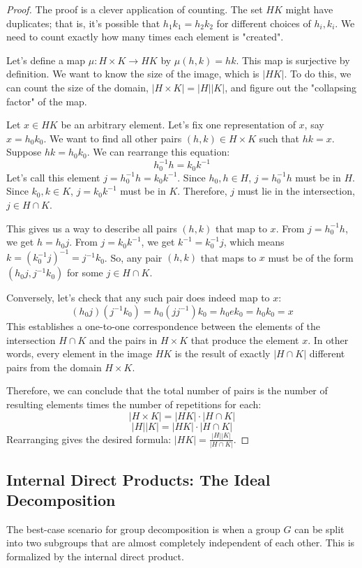 \documentclass[12pt,a4paper]{article}
\theoremstyle{plain} %
\theoremstyle{definition} %
\theoremstyle{remark} %
\begin{document}
\begin{proof}
The proof is a clever application of counting. The set $HK$ might have duplicates; that is, it's possible that $h_1k_1 = h_2k_2$ for different choices of $h_i, k_i$. We need to count exactly how many times each element is "created".

Let's define a map $\mu: H \times K \to HK$ by $\mu(h,k) = hk$. This map is surjective by definition. We want to know the size of the image, which is $|HK|$. To do this, we can count the size of the domain, $|H \times K| = |H||K|$, and figure out the "collapsing factor" of the map.

Let $x \in HK$ be an arbitrary element. Let's fix one representation of $x$, say $x=h_0k_0$. We want to find all other pairs $(h,k) \in H \times K$ such that $hk = x$.
Suppose $hk = h_0k_0$. We can rearrange this equation:
\[
h_0^{-1}h = k_0k^{-1}
\]
Let's call this element $j = h_0^{-1}h = k_0k^{-1}$.
Since $h_0, h \in H$, $j = h_0^{-1}h$ must be in $H$.
Since $k_0, k \in K$, $j = k_0k^{-1}$ must be in $K$.
Therefore, $j$ must lie in the intersection, $j \in H \cap K$.

This gives us a way to describe all pairs $(h,k)$ that map to $x$.
From $j=h_0^{-1}h$, we get $h = h_0j$.
From $j=k_0k^{-1}$, we get $k^{-1}=k_0^{-1}j$, which means $k = (k_0^{-1}j)^{-1} = j^{-1}k_0$.
So, any pair $(h,k)$ that maps to $x$ must be of the form $(h_0j, j^{-1}k_0)$ for some $j \in H \cap K$.

Conversely, let's check that any such pair does indeed map to $x$:
\[
(h_0j)(j^{-1}k_0) = h_0(jj^{-1})k_0 = h_0ek_0 = h_0k_0 = x
\]
This establishes a one-to-one correspondence between the elements of the intersection $H \cap K$ and the pairs in $H \times K$ that produce the element $x$. In other words, every element in the image $HK$ is the result of exactly $|H \cap K|$ different pairs from the domain $H \times K$.

Therefore, we can conclude that the total number of pairs is the number of resulting elements times the number of repetitions for each:
\[
|H \times K| = |HK| \cdot |H \cap K|
\]
\[
|H| |K| = |HK| \cdot |H \cap K|
\]
Rearranging gives the desired formula: $|HK| = \frac{|H| |K|}{|H \cap K|}$.
\end{proof}

\subsection{Internal Direct Products: The Ideal Decomposition}
The best-case scenario for group decomposition is when a group $G$ can be split into two subgroups that are almost completely independent of each other. This is formalized by the internal direct product.
\end{document}
